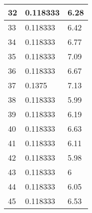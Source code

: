 \begin{table}
\begin{tabular}{ | l | l | l |}
    32 & 0.118333 & 6.28 \\ \hline
    33 & 0.118333 & 6.42 \\ \hline
    34 & 0.118333 & 6.77 \\ \hline
    35 & 0.118333 & 7.09 \\ \hline
    36 & 0.118333 & 6.67 \\ \hline
    37 & 0.1375 & 7.13 \\ \hline
    38 & 0.118333 & 5.99 \\ \hline
    39 & 0.118333 & 6.19 \\ \hline
    40 & 0.118333 & 6.63 \\ \hline
    41 & 0.118333 & 6.11 \\ \hline
    42 & 0.118333 & 5.98 \\ \hline
    43 & 0.118333 & 6 \\ \hline
    44 & 0.118333 & 6.05 \\ \hline
    45 & 0.118333 & 6.53 \\ \hline
    \end{tabular}
\label{table:CPU second test}
\end{table}
\bigskip

